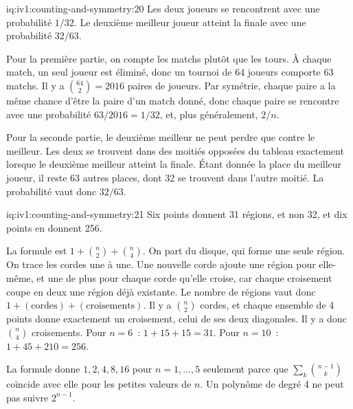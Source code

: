 \begin{solution}{iq:iv1:counting-and-symmetry:20}
Les deux joueurs se rencontrent avec une probabilité $1/32$. Le deuxième meilleur joueur atteint la finale avec une probabilité $32/63$.

Pour la première partie, on compte les matchs plutôt que les tours. À chaque match, un seul joueur est éliminé, donc un tournoi de 64 joueurs comporte 63 matchs. Il y a $\binom{64}{2} = 2016$ paires de joueurs. Par symétrie, chaque paire a la même chance d'être la paire d'un match donné, donc chaque paire se rencontre avec une probabilité $63/2016 = 1/32$, et, plus généralement, $2/n$.

Pour la seconde partie, le deuxième meilleur ne peut perdre que contre le meilleur. Les deux se trouvent dans des moitiés opposées du tableau exactement lorsque le deuxième meilleur atteint la finale. Étant donnée la place du meilleur joueur, il reste 63 autres places, dont 32 se trouvent dans l'autre moitié. La probabilité vaut donc $32/63$.


\end{solution}

\begin{solution}{iq:iv1:counting-and-symmetry:21}
Six points donnent 31 régions, et non 32, et dix points en donnent 256.

La formule est $1 + \binom{n}{2} + \binom{n}{4}$. On part du disque, qui forme une seule région. On trace les cordes une à une. Une nouvelle corde ajoute une région pour elle-même, et une de plus pour chaque corde qu'elle croise, car chaque croisement coupe en deux une région déjà existante. Le nombre de régions vaut donc $1 + (\text{cordes}) + (\text{croisements})$. Il y a $\binom{n}{2}$ cordes, et chaque ensemble de 4 points donne exactement un croisement, celui de ses deux diagonales. Il y a donc $\binom{n}{4}$ croisements. Pour $n = 6$~: $1 + 15 + 15 = 31$. Pour $n = 10$~: $1 + 45 + 210 = 256$.

La formule donne $1, 2, 4, 8, 16$ pour $n = 1, \dots, 5$ seulement parce que $\sum_k \binom{n-1}{k}$ coïncide avec elle pour les petites valeurs de $n$. Un polynôme de degré 4 ne peut pas suivre $2^{n-1}$.

\end{solution}

